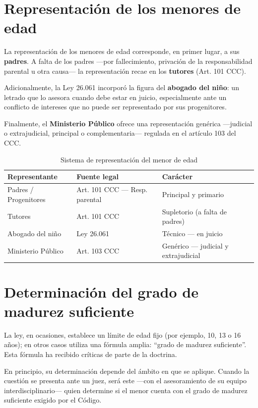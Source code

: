 \documentclass[12pt,oneside]{book}
\begin{document}
\section{Representación de los menores de edad}

La representación de los menores de edad corresponde, en primer lugar, a sus \textbf{padres}. A falta de los padres —por fallecimiento, privación de la responsabilidad parental u otra causa— la representación recae en los \textbf{tutores} (Art. 101 CCC).

Adicionalmente, la Ley 26.061 incorporó la figura del \textbf{abogado del niño}: un letrado que lo asesora cuando debe estar en juicio, especialmente ante un conflicto de intereses que no puede ser representado por sus progenitores.

Finalmente, el \textbf{Ministerio Público} ofrece una representación genérica —judicial o extrajudicial, principal o complementaria— regulada en el artículo 103 del CCC.

\begin{table}[H]
\centering
\caption{Sistema de representación del menor de edad}
\begin{tabularx}{\textwidth}{Xll}
\toprule
\textbf{Representante} & \textbf{Fuente legal} & \textbf{Carácter} \\
\midrule
Padres / Progenitores & Art. 101 CCC — Resp. parental & Principal y primario \\
Tutores & Art. 101 CCC & Supletorio (a falta de padres) \\
Abogado del niño & Ley 26.061 & Técnico — en juicio \\
Ministerio Público & Art. 103 CCC & Genérico — judicial y extrajudicial \\
\bottomrule
\end{tabularx}
\end{table}

\section{Determinación del grado de madurez suficiente}

La ley, en ocasiones, establece un límite de edad fijo (por ejemplo, 10, 13 o 16 años); en otros casos utiliza una fórmula amplia: \textquotedblleft grado de madurez suficiente\textquotedblright. Esta fórmula ha recibido críticas de parte de la doctrina.

En principio, su determinación depende del ámbito en que se aplique. Cuando la cuestión se presenta ante un juez, será este —con el asesoramiento de su equipo interdisciplinario— quien determine si el menor cuenta con el grado de madurez suficiente exigido por el Código.
\end{document}
